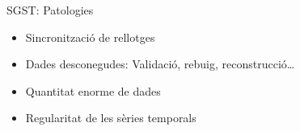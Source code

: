 \begin{frame}{SGST: Patologies}


  \begin{itemize}

    \item Sincronització de rellotges \parencite{kopetz11:realtime}
    \item Dades desconegudes: Validació, rebuig, reconstrucció\dots
    \item Quantitat enorme de dades
    \item Regularitat de les sèries temporals
  \end{itemize}
  

\end{frame}



